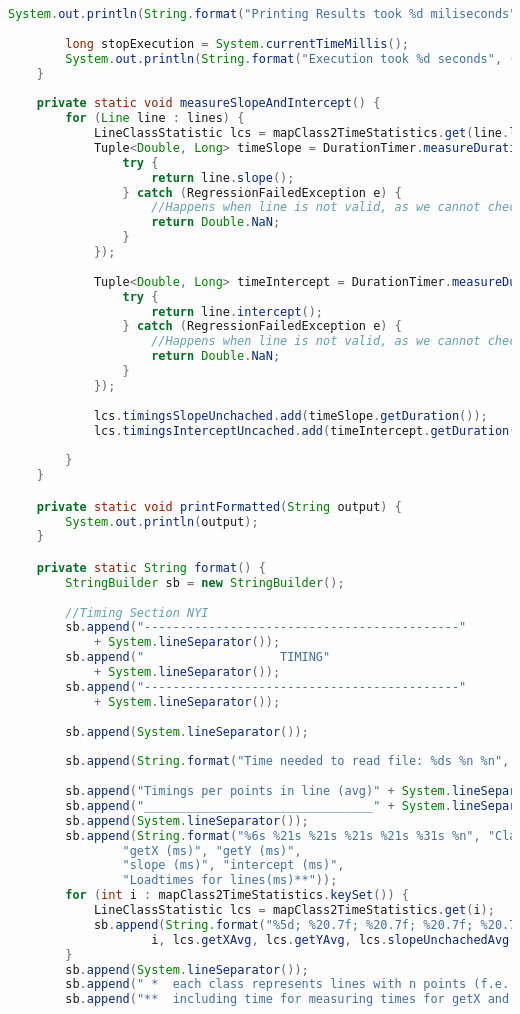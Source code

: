 \begin{lstlisting}[language=java,
    label=lst:analysisrunner,
    caption=Starter class for analysis with main()
]
		System.out.println(String.format("Printing Results took %d miliseconds", endPrint - startPrint));
		
		long stopExecution = System.currentTimeMillis();
		System.out.println(String.format("Execution took %d seconds", (stopExecution-startExecution) / 1000));
	}
	
	private static void measureSlopeAndIntercept() {
		for (Line line : lines) {
			LineClassStatistic lcs = mapClass2TimeStatistics.get(line.length());
			Tuple<Double, Long> timeSlope = DurationTimer.measureDurationForCallInNs(()-> {
				try {
					return line.slope();
				} catch (RegressionFailedException e) {
					//Happens when line is not valid, as we cannot check without caching slope and intercept
					return Double.NaN;
				}
			});
			
			Tuple<Double, Long> timeIntercept = DurationTimer.measureDurationForCallInNs(()-> {
				try {
					return line.intercept();
				} catch (RegressionFailedException e) {
					//Happens when line is not valid, as we cannot check without caching slope and intercept
					return Double.NaN;
				}
			});
			
			lcs.timingsSlopeUnchached.add(timeSlope.getDuration());
			lcs.timingsInterceptUncached.add(timeIntercept.getDuration());
			
		}
	}

	private static void printFormatted(String output) {
		System.out.println(output);
	}

	private static String format() {
		StringBuilder sb = new StringBuilder();
		
		//Timing Section NYI
        sb.append("--------------------------------------------" 
            + System.lineSeparator());
        sb.append("                   TIMING" 
            + System.lineSeparator());
        sb.append("--------------------------------------------" 
            + System.lineSeparator());
		
		sb.append(System.lineSeparator());
		
		sb.append(String.format("Time needed to read file: %ds %n %n", (stopRead - startRead) / 1000));
		
		sb.append("Timings per points in line (avg)" + System.lineSeparator());
		sb.append("________________________________" + System.lineSeparator());
		sb.append(System.lineSeparator());
		sb.append(String.format("%6s %21s %21s %21s %21s %31s %n", "Class*",
				"getX (ms)", "getY (ms)",
				"slope (ms)", "intercept (ms)",
				"Loadtimes for lines(ms)**"));
		for (int i : mapClass2TimeStatistics.keySet()) {
			LineClassStatistic lcs = mapClass2TimeStatistics.get(i);
			sb.append(String.format("%5d; %20.7f; %20.7f; %20.7f; %20.7f; %30.2f; %n",
					i, lcs.getXAvg, lcs.getYAvg, lcs.slopeUnchachedAvg / (double) 1000000, lcs.interceptUnchachedAvg/ (double) 1000000, lcs.loadTimeLineAvg));
		}
		sb.append(System.lineSeparator());
		sb.append(" *  each class represents lines with n points (f.e. Class 2 means all lines with length=2)" + System.lineSeparator());
		sb.append("**  including time for measuring times for getX and getY"+ System.lineSeparator());



\end{lstlisting}
